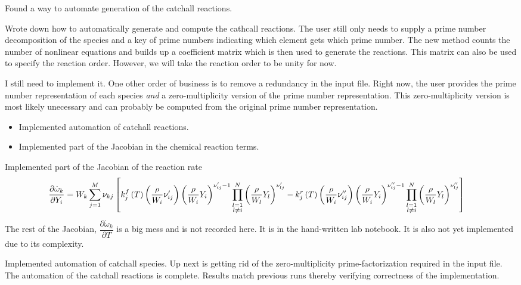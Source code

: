 \documentclass[fontsize=11pt, %
               paper=a4, %
               oneside, %
               captions=tableheading,
               index=totoc,
               hyperref]{labbook}
\newcommand{\lr}[1]{\left(#1\right)}
\newcommand{\pdeone}[2]{\frac{\partial #1}{\partial #2}}
\begin{document}
Found a way to automate generation of the catchall reactions.

Wrote down how to automatically generate and compute the cathcall reactions.  The user still only needs to supply a prime number decomposition of the species and a key of prime numbers indicating which element gets which prime number.  The new method counts the number of nonlinear equations and builds up a coefficient matrix which is then used to generate the reactions.  This matrix can also be used to specify the reaction order.  However, we will take the reaction order to be unity for now.

I still need to implement it.  One other order of business is to remove a redundancy in the input file.  Right now, the user provides the prime number representation of each species \textit{and} a zero-multiplicity version of the prime number representation.  This zero-multiplicity version is most likely unecessary and can probably be computed from the original prime number representation.

\begin{itemize}
  \item Implemented automation of catchall reactions.
  \item Implemented part of the Jacobian in the chemical reaction terms.
\end{itemize}


Implemented part of the Jacobian of the reaction rate
\begin{align*}
  \hspace{-1.0em}\pdeone{\dot\omega_{k}}{Y_{i}} = W_{k}\sum_{j=1}^{M}\nu_{kj}\left[k_{j}^{f}\lr{T}\lr{\frac{\rho}{W_{i}}\nu_{ij}^{\prime}}\lr{\frac{\rho}{W_{i}}Y_{i}}^{\nu_{ij}^{\prime}-1}\prod_{\substack{l=1 \\ l\neq i}}^{N}\lr{\frac{\rho}{W_{l}}Y_{l}}^{\nu_{lj}^{\prime}} - k_{j}^{r}\lr{T}\lr{\frac{\rho}{W_{i}}\nu_{ij}^{\prime\prime}}\lr{\frac{\rho}{W_{i}}Y_{i}}^{\nu_{ij}^{\prime\prime}-1}\prod_{\substack{l=1 \\ l\neq i}}^{N}\lr{\frac{\rho}{W_{l}}Y_{l}}^{\nu_{lj}^{\prime\prime}}\right]
\end{align*}
The rest of the Jacobian, $\dfrac{\partial\dot\omega_{k}}{\partial T}$ is a big mess and is not recorded here.  It is in the hand-written lab notebook.  It is also not yet implemented due to its complexity.

Implemented automation of catchall species.  Up next is getting rid of the zero-multiplicity prime-factorization required in the input file.
The automation of the catchall reactions is complete.  Results match previous runs thereby verifying correctness of the implementation.


\end{document}
